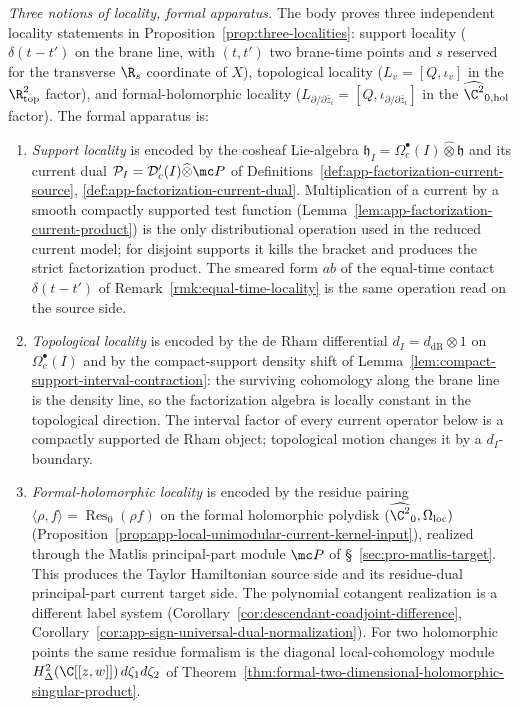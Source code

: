 \medskip
\noindent\emph{Three notions of locality, formal apparatus.}  The body
proves three independent locality statements in
Proposition~\ref{prop:three-localities}: support locality
(\(\delta(t-t')\) on the brane line, with \((t,t')\) two brane-time
points and \(s\) reserved for the transverse \(\R_s\) coordinate of
\(X\)), topological locality
(\(L_v=[Q,\iota_v]\) in the \(\R^2_{\mathrm{top}}\) factor), and
formal-holomorphic locality
(\(L_{\partial/\partial\bar z_i}
   =[Q,\iota_{\partial/\partial\bar z_i}]\) in the
\(\widehat{\C^2}_{0,\mathrm{hol}}\) factor).  The formal apparatus is:
\begin{enumerate}
  \item \emph{Support locality} is encoded by the cosheaf
    Lie-algebra \(\mathfrak h_I=\Omega^\bullet_c(I)\widehat\otimes\mathfrak h\)
    and its current dual \(\mathcal P_I=\mathcal D'_c(I)\widehat\otimes\mc P\)
    of Definitions~\ref{def:app-factorization-current-source},
    \ref{def:app-factorization-current-dual}.  Multiplication of a
    current by a smooth compactly supported test function
    (Lemma~\ref{lem:app-factorization-current-product}) is the only
    distributional operation used in the reduced current model; for
    disjoint supports it kills the bracket and produces the strict
    factorization product.  The smeared form \(ab\) of the equal-time
    contact \(\delta(t-t')\) of
    Remark~\ref{rmk:equal-time-locality} is the same operation read on
    the source side.
  \item \emph{Topological locality} is encoded by the de Rham
    differential \(d_I=d_{\mathrm{dR}}\otimes 1\) on \(\Omega^\bullet_c(I)\)
    and by the compact-support density shift of
    Lemma~\ref{lem:compact-support-interval-contraction}: the surviving
    cohomology along the brane line is the density line, so the
    factorization algebra is locally constant in the topological
    direction.  The interval factor of every current operator below is
    a compactly supported de Rham object; topological motion changes it
    by a \(d_I\)-boundary.
  \item \emph{Formal-holomorphic locality} is encoded by the residue
    pairing \(\langle\rho,f\rangle=\operatorname{Res}_0(\rho f)\) on
    the formal holomorphic polydisk
    \((\widehat{\C^2}_0,\Omega_{\mathrm{loc}})\)
    (Proposition~\ref{prop:app-local-unimodular-current-kernel-input}),
    realized through the Matlis principal-part module \(\mc P\) of
    \S~\ref{sec:pro-matlis-target}.  This produces the
    Taylor Hamiltonian source side and its residue-dual
    principal-part current target side.  The polynomial cotangent
    realization is a different label system
    (Corollary~\ref{cor:descendant-coadjoint-difference},
    Corollary~\ref{cor:app-sign-universal-dual-normalization}).  For
    two holomorphic points the same residue formalism is the diagonal
    local-cohomology module
    \(H^2_\Delta(\C[[z,w]])\,d\zeta_1d\zeta_2\) of
    Theorem~\ref{thm:formal-two-dimensional-holomorphic-singular-product}.
\end{enumerate}
